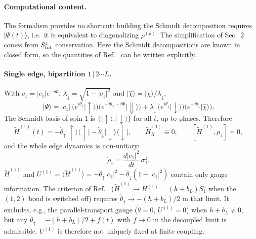 \documentclass[11pt]{article}
\newcommand{\ket}[1]{\lvert #1\rangle}
\newcommand{\bra}[1]{\langle #1\rvert}
\newcommand{\up}{\uparrow}
\newcommand{\dn}{\downarrow}
\newcommand{\Ht}{\tilde H}
\begin{document}
\paragraph{Computational content.}
The formalism provides no shortcut: building the Schmidt decomposition requires $\ket{\Psi(t)}$, i.e.\ it is equivalent to diagonalizing $\rho^{(k)}$. The simplification of Sec.~2 comes from $S^z_{\rm tot}$ conservation. Here the Schmidt decompositions are known in closed form, so the quantities of Ref.~\cite{MB22} can be written explicitly.

\paragraph{Single edge, bipartition $1\,|\,2\cdots L$.}
With $c_1=|c_1|e^{-i\Phi}$, $\lambda_\dn=\sqrt{1-|c_1|^2}$ and $\ket{\hat\chi}=\ket{\chi}/\lambda_\dn$,
\begin{equation}
\ket{\Psi}=|c_1|\,\bigl(e^{i\theta_\up}\ket{\up}\bigr)\bigl(e^{-i\theta_\up-i\Phi}\ket{\Downarrow}\bigr)
+\lambda_\dn\,\bigl(e^{i\theta_\dn}\ket{\dn}\bigr)\bigl(e^{-i\theta_\dn}\ket{\hat\chi}\bigr).
\end{equation}
The Schmidt basis of spin 1 is $\{\ket\up,\ket\dn\}$ for all $t$, up to phases. Therefore
\begin{equation}
\Ht^{(1)}(t)=-\dot\theta_\up\ket\up\bra\up-\dot\theta_\dn\ket\dn\bra\dn,\qquad
\Ht^{(1)}_X\equiv0,\qquad [\Ht^{(1)},\rho_1]=0,
\end{equation}
and the whole edge dynamics is non-unitary:
\begin{equation}
\dot\rho_1=\frac{d|c_1|^2}{dt}\,\sigma^z_1 .
\end{equation}
$\Ht^{(1)}$ and $U^{(1)}=\langle\Ht^{(1)}\rangle=-\dot\theta_\up|c_1|^2-\dot\theta_\dn(1-|c_1|^2)$ contain only gauge information.
The criterion of Ref.~\cite{MB22} ($\Ht^{(1)}\to H^{(1)}=(h+b_L)S^z_1$ when the $(1,2)$ bond is switched off) requires $\dot\theta_\up\to-(h+b_L)/2$ in that limit. It excludes, e.g., the parallel-transport gauge ($\dot\theta=0$, $U^{(1)}=0$) when $h+b_L\neq0$, but any $\dot\theta_\up=-(h+b_L)/2+f(t)$ with $f\to0$ in the decoupled limit is admissible. $U^{(1)}$ is therefore not uniquely fixed at finite coupling.
\end{document}
